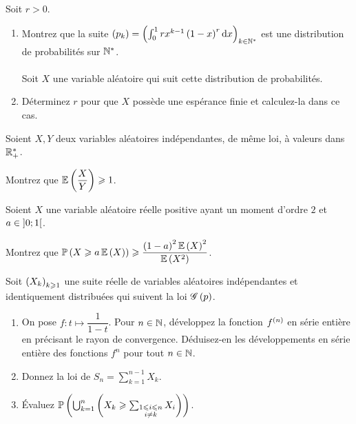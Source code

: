\begin{exoss}
Soit \(r>0\).

\begin{enumerate}
    \item Montrez que la suite \(\paren{p_k}=\paren{\int_0^1rx^{k-1}\paren{1-x}^r\odif{x}}_{k\in\Ns}\) est une distribution de probabilités sur \(\mathbb{N}^*\). \\\\ Soit \(X\) une variable aléatoire qui suit cette distribution de probabilités. \\
    \item Déterminez \(r\) pour que \(X\) possède une espérance finie et calculez-la dans ce cas.
\end{enumerate}
\end{exoss}

\begin{exoss}
Soient \(X,Y\) deux variables aléatoires indépendantes, de même loi, à valeurs dans \(\mathbb{R}_+^*\).

Montrez que \(\operatorname{\mathbb{E}}\left(\dfrac{X}{Y}\right)\geqslant1\).
\end{exoss}

\begin{exoss}
Soient \(X\) une variable aléatoire réelle positive ayant un moment d'ordre \(2\) et \(a\in\left]0;1\right[\).

Montrez que \(\mathbb{P}\left(X\geqslant a\operatorname{\mathbb{E}}\left(X\right)\right)\geqslant\dfrac{\left(1-a\right)^2\operatorname{\mathbb{E}}\left(X\right)^2}{\operatorname{\mathbb{E}}\left(X^2\right)}\).
\end{exoss}

\begin{exoss}
Soit \(\left(X_k\right)_{k\geqslant1}\) une suite réelle de variables aléatoires indépendantes et identiquement distribuées qui suivent la loi \(\mathscr{G}\left(p\right)\).

\begin{enumerate}
    \item On pose \(f:t\mapsto\dfrac{1}{1-t}\). Pour \(n\in\mathbb{N}\), développez la fonction \(f^{\left(n\right)}\) en série entière en précisant le rayon de convergence. Déduisez-en les développements en série entière des fonctions \(f^n\) pour tout \(n\in\mathbb{N}\). \\
    \item Donnez la loi de \(S_n=\sum_{k=1}^{n-1}X_k\). \\
    \item Évaluez \(\mathbb{P}\left(\bigcup_{k=1}^n\left(X_k\geqslant\sum_{\substack{1\leqslant i\leqslant n \\ i\not=k}}X_i\right)\right)\).
\end{enumerate}
\end{exoss}

